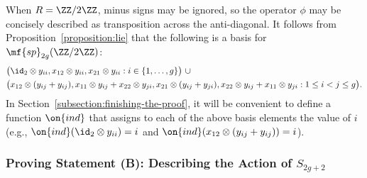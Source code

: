 \begin{remark} \label{remark:sp-basis}
	When $R = \ZZ/2\ZZ$, minus signs may be ignored, so the operator $\phi$ may be concisely described as transposition across the anti-diagonal. It follows from Proposition~\ref{proposition:lie} that the following is a basis for $\mf{sp}_{2g}(\ZZ/2\ZZ)$:
	\begin{align*}
    & \big(\id_2 \otimes y_{ii}, x_{12} \otimes y_{ii}, x_{21} \otimes y_{ii} : i \in \{1, \dots, g\}\big)\,\, \cup \\
    & \big(x_{12} \otimes (y_{ij}+y_{ij}) , x_{11} \otimes y_{ij} + x_{22} \otimes y_{ji} ,  x_{21} \otimes (y_{ij} + y_{ji}) , x_{22} \otimes y_{ij} + x_{11} \otimes y_{ji} : 1 \leq i < j \leq g \big).
\end{align*}
In Section~\ref{subsection:finishing-the-proof}, it will be convenient to define a function $\on{ind}$ that assigns to each of the above basis elements the value of $i$ (e.g., $\on{ind}(\id_2 \otimes y_{ii}) = i$ and $\on{ind}(x_{12} \otimes (y_{ij} + y_{ij})) = i$).
\end{remark}  

\subsubsection{Proving Statement (B): Describing the Action of $S_{2g+2}$} \label{subsection:s-action} 

